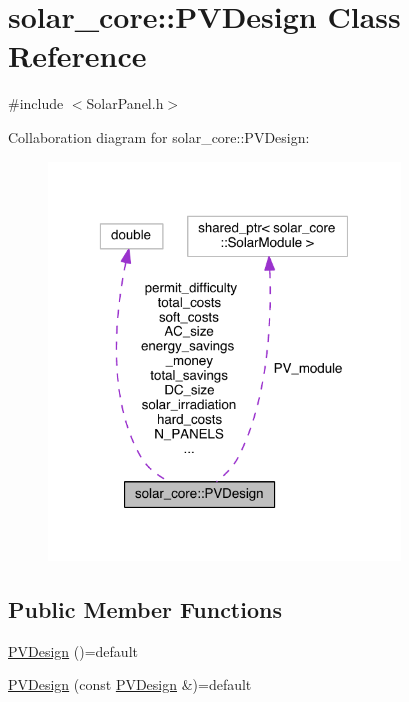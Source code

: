 \hypertarget{classsolar__core_1_1_p_v_design}{}\section{solar\+\_\+core\+:\+:P\+V\+Design Class Reference}
\label{classsolar__core_1_1_p_v_design}


{\ttfamily \#include $<$Solar\+Panel.\+h$>$}



Collaboration diagram for solar\+\_\+core\+:\+:P\+V\+Design\+:
\nopagebreak
\begin{figure}[H]
\begin{center}
\leavevmode
\includegraphics[width=265pt]{classsolar__core_1_1_p_v_design__coll__graph}
\end{center}
\end{figure}
\subsection*{Public Member Functions}
\begin{DoxyCompactItemize}
\item 
\hyperlink{classsolar__core_1_1_p_v_design_a81f17c9ff8bba733daf22c578efa3e20}{P\+V\+Design} ()=default
\item 
\hyperlink{classsolar__core_1_1_p_v_design_ad599fa6820474d64dcc9142a5e76e983}{P\+V\+Design} (const \hyperlink{classsolar__core_1_1_p_v_design}{P\+V\+Design} \&)=default
\end{DoxyCompactItemize}
